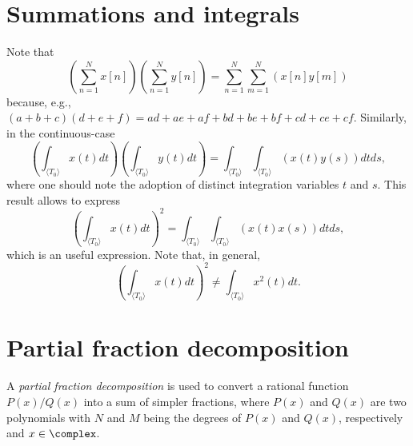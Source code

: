 \section{Summations and integrals}

Note that
\[
\left( \sum_{n=1}^N x[n] \right) \left( \sum_{n=1}^N y[n] \right) = \sum_{n=1}^N \sum_{m=1}^N \left( x[n]y[m] \right)
\]
because, e.g., $(a+b+c)(d+e+f)=ad+ae+af+bd+be+bf+cd+ce+cf$. Similarly, in the continuous-case
\[
\left( \int_{\langle T_0\rangle} x(t) dt \right) \left( \int_{\langle T_0\rangle} y(t) dt \right) = \int_{\langle T_0\rangle} \int_{\langle T_0\rangle} \left( x(t)y(s) \right) dt ds,
\]
where one should note the adoption of distinct integration variables $t$ and $s$.
This result allows to express 
\begin{equation}
\left( \int_{\langle T_0\rangle} x(t) dt \right)^2 = \int_{\langle T_0\rangle} \int_{\langle T_0\rangle} \left( x(t)x(s) \right) dt ds,
\label{eq:squaredintegral}
\end{equation}
which is an useful expression. Note that, in general,
\[
\left( \int_{\langle T_0\rangle} x(t) dt \right)^2 \ne \int_{\langle T_0\rangle}  x^2(t)  dt.
\]


\section{Partial fraction decomposition}
\label{sec:partial_fraction}

A \emph{partial fraction decomposition} is used to convert a rational function $P(x)/Q(x)$ into a sum of simpler fractions, where $P(x)$ and $Q(x)$ are two polynomials with $N$ and $M$ being the degrees of $P(x)$ and $Q(x)$, respectively and $x \in \complex$.

